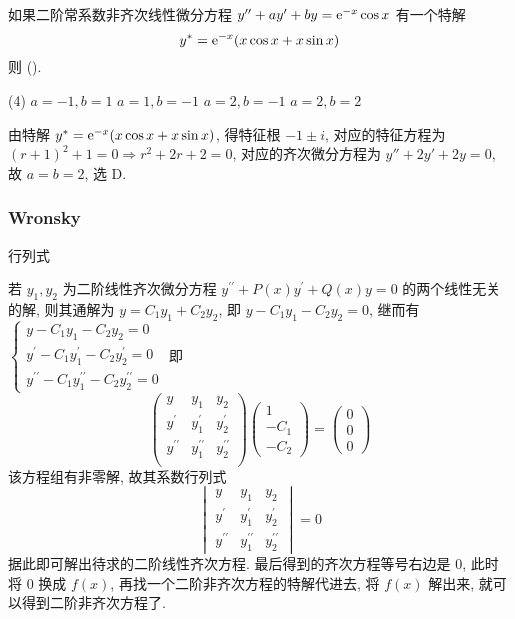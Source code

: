 \begin{example}
    如果二阶常系数非齐次线性微分方程 $y''+ay'+by=\mathrm{e} ^{-x}\cos x$ 有一个特解 $$y^*=\mathrm{e} ^{-x}(x\cos x+x\sin x)$$ 则 (\quad).
    \begin{tasks}(4)
        \task $a=-1,b=1$
        \task $a=1,b=-1$
        \task $a=2,b=-1$
        \task $a=2,b=2$
    \end{tasks}
\end{example}
\begin{solution}
    由特解 $y^*=\mathrm{e} ^{-x}(x\cos x+x\sin x)$, 得特征根 $-1\pm i$, 对应的特征方程为 $(r+1)^2+1=0\Rightarrow r^2+2r+2=0$, 对应的齐次微分方程为 $y''+2y'+2y=0$, 故 $a=b=2$, 选 D.
\end{solution}

\subsubsection{Wronsky} 行列式

若 $ y_{1}, y_{2} $ 为二阶线性齐次微分方程 $ y^{\prime \prime}+P(x) y^{\prime}+Q(x) y=0 $ 的两个线性无关的解, 则其通解为 $ y=C_{1} y_{1}+C_{2} y_{2} $, 即 $ y-C_{1} y_{1}-C_{2} y_{2}=0 $, 继而有
$
    \begin{cases}
        y-C_{1} y_{1}-C_{2} y_{2}=0                            \\
        y^{\prime}-C_{1} y_{1}^{\prime}-C_{2} y_{2}^{\prime}=0 \\
        y^{\prime \prime}-C_{1} y_{1}^{\prime \prime}-C_{2} y_{2}^{\prime \prime}=0
    \end{cases}
$
即 $$\begin{pmatrix}  y & y_{1} & y_{2} \\ y^{\prime} & y_{1}^{\prime} & y_{2}^{\prime} \\ y^{\prime \prime} & y_{1}^{\prime \prime} & y_{2}^{\prime \prime}\\\end{pmatrix} \begin{pmatrix}1 \\ -C_{1} \\ -C_{2}\end{pmatrix}=\begin{pmatrix}0 \\ 0 \\ 0\end{pmatrix}$$
该方程组有非零解, 故其系数行列式
$$
    \begin{vmatrix}y                 & y_{1}                 & y_{2}                 \\
               y^{\prime}        & y_{1}^{\prime}        & y_{2}^{\prime}        \\
               y^{\prime \prime} & y_{1}^{\prime \prime} & y_{2}^{\prime \prime}\end{vmatrix}=0
$$
据此即可解出待求的二阶线性齐次方程. 最后得到的齐次方程等号右边是 0, 此时将 0 换成 $ f(x) $, 再找一个二阶非齐次方程的特解代进去, 将 $ f(x) $ 解出来, 就可以得到二阶非齐次方程了.

